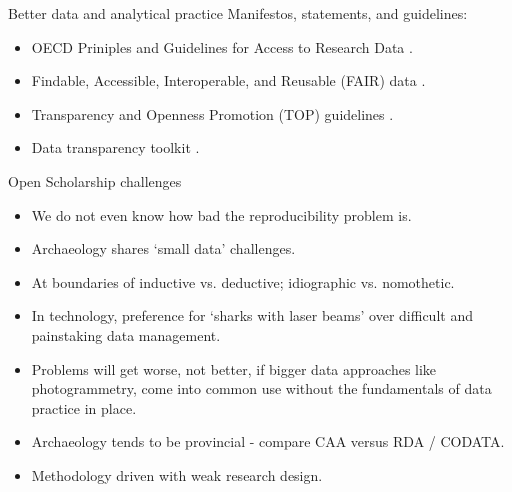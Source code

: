 \documentclass[aspectratio=169, 11pt]{beamer} %
\begin{document}
\begin{frame}{Better data and analytical practice}
  Manifestos, statements, and guidelines:
    \begin{itemize}[label=\textbullet]
        \item OECD Priniples and Guidelines for Access to Research Data \cite{Oecd2007-vi}.
        \item Findable, Accessible, Interoperable, and Reusable (FAIR) data \cite{Wilkinson2016-mr, Go-fair2017-vs}.
        \item Transparency and Openness Promotion (TOP) guidelines \cite{Nosek2015-wm, Cos2019-mr}.
        \item Data transparency toolkit \cite{Perkel2018-rw}.
    \end{itemize}
\end{frame}

\begin{frame}{Open Scholarship challenges}
    \begin{itemize}[label=\textbullet]
        \item We do not even know how bad the reproducibility problem is.
        \item Archaeology shares `small data' challenges.
        \item At boundaries of inductive vs. deductive; idiographic vs. nomothetic.
        \item In technology, preference for `sharks with laser beams' over difficult and painstaking data management. 
        \item Problems will get worse, not better, if bigger data approaches like photogrammetry, come into common use without the fundamentals of data practice in place.
        \item Archaeology tends to be provincial - compare CAA versus RDA / CODATA. 
        \item Methodology driven with weak research design. \cite{Hole1973-cy}
    \end{itemize}
\end{frame}
\end{document}
